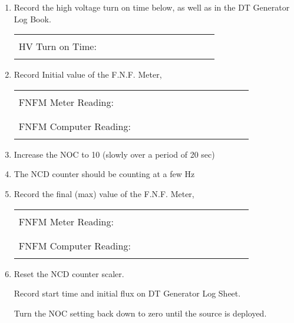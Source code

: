 \begin{enumerate}
\item\checkbox
 Record the high voltage turn on time below,
 as well as in the DT Generator Log Book. 
     \begin{center}
     \begin{tabular}{|l|}
     \hline
      \\
     HV Turn on Time:~~~~~~~~~~~~~~~~~~~~~~~~\\
      \\
     \hline
     \end{tabular}
     \end{center}
 

\item\checkbox
 Record Initial value of the F.N.F. Meter, 
     \begin{center}
     \begin{tabular}{|l|}
     \hline
      \\
     FNFM Meter Reading:~~~~~~~~~~~~~~~~~~~~~~~~\\
      \\
     \hline
       \\
     FNFM Computer Reading:~~~~~~~~~~~~~~~~~~~~~~~~\\
      \\
     \hline
     \end{tabular}
     \end{center}
\item\checkbox
 Increase the NOC to 10 (slowly over a period of 20 sec) 
 

\item\checkbox The NCD counter should be counting at a few Hz


\item\checkbox
 Record the final (max) value of the F.N.F. Meter, 
     \begin{center}
     \begin{tabular}{|l|}
     \hline
      \\
     FNFM Meter Reading:~~~~~~~~~~~~~~~~~~~~~~~~\\
      \\
     \hline
       \\
     FNFM Computer Reading:~~~~~~~~~~~~~~~~~~~~~~~~\\
      \\
     \hline
     \hline
     \end{tabular}
     \end{center}


\item\checkbox
 Reset the NCD counter scaler.

\checkitem Record start time and initial flux on DT Generator Log Sheet.

\checkitem Turn the NOC setting back down to zero until the source
 is deployed.


\end{enumerate}


